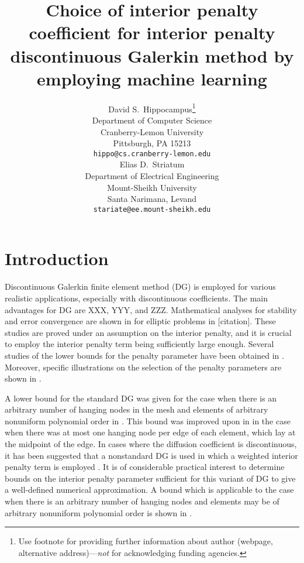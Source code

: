 \documentclass{article}
\title{Choice of interior penalty coefficient for interior penalty discontinuous Galerkin method by employing machine learning}
\author{
  David S.~Hippocampus\thanks{Use footnote for providing further
    information about author (webpage, alternative
    address)---\emph{not} for acknowledging funding agencies.} \\
  Department of Computer Science\\
  Cranberry-Lemon University\\
  Pittsburgh, PA 15213 \\
  \texttt{hippo@cs.cranberry-lemon.edu} \\
   \And
 Elias D.~Striatum \\
  Department of Electrical Engineering\\
  Mount-Sheikh University\\
  Santa Narimana, Levand \\
  \texttt{stariate@ee.mount-sheikh.edu} \\
}
\begin{document}
\maketitle

\begin{abstract}
\lipsum[1]
\end{abstract}




\section{Introduction}

Discontinuous Galerkin finite element method (DG) is employed for various realistic applications, especially with discontinuous coefficients. The main advantages for DG are XXX, YYY, and ZZZ. Mathematical analyses for stability and error convergence are shown in for elliptic problems in [citation]. 
These studies are proved under an assumption on the interior penalty, and it is   crucial to employ the interior penalty term being sufficiently large enough. 
Several studies of the lower bounds for the penalty parameter have been obtained in \cite{ainsworth2007posteriori,ainsworth2010fully,ainsworth2009constant,epshteyn2007estimation,shahbazi2005explicit}. Moreover, specific illustrations on the selection of the penalty parameters are shown in \cite{ainsworth2012note}.


A lower bound for the standard DG was given for the case when there is an arbitrary number of hanging nodes in the mesh and elements of arbitrary nonuniform polynomial order in \cite{shahbazi2005explicit}.
This bound was improved upon in \cite{ainsworth2009constant} in the case when there was at most one hanging node per edge of each element, which lay at the midpoint of the edge. 
In cases where the diffusion coefficient is discontinuous, it has been suggested that a nonstandard DG is used in which a weighted interior penalty term is employed \cite{ern2008posteriori,ern2009discontinuous}. 
It is of considerable practical interest to
determine bounds on the interior penalty parameter sufficient for this variant of DG to give
a well-defined numerical approximation. 
A bound which is
applicable to the case when there is an arbitrary number of hanging nodes and elements may be of arbitrary nonuniform polynomial order is shown in  \cite{ainsworth2012note}.
\end{document}
